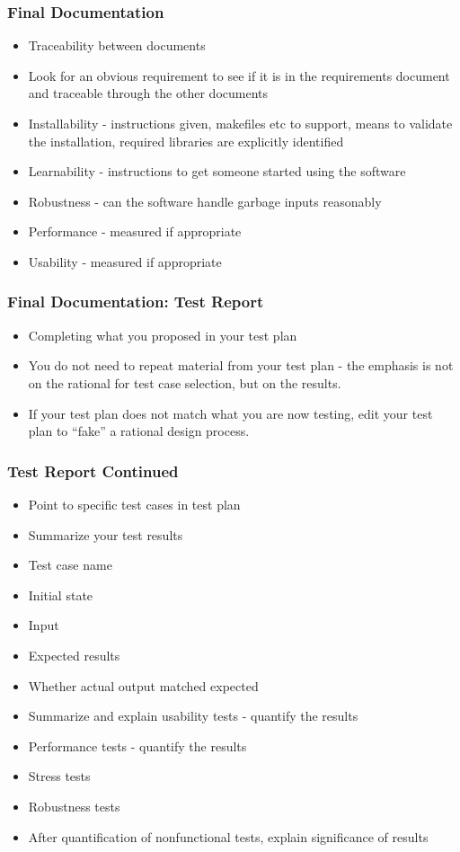 \documentclass[t,12pt,numbers,fleqn]{beamer}
\begin{document}
\begin{frame}
\frametitle{Final Documentation}
\begin{itemize}
\item Traceability between documents
\item Look for an obvious requirement to see if it is in the requirements
  document and traceable through the other documents
\item Installability - instructions given, makefiles etc to support, means to
  validate the installation, required libraries are explicitly identified
\item Learnability - instructions to get someone started using the software
\item Robustness - can the software handle garbage inputs reasonably
\item Performance - measured if appropriate
\item Usability - measured if appropriate
\end{itemize}
\end{frame}


\begin{frame}
\frametitle{Final Documentation: Test Report}
\begin{itemize}
\item Completing what you proposed in your test plan
\item You do not need to repeat material from your test plan - the emphasis is
  not on the rational for test case selection, but on the results.
\item If your test plan does not match what you are now testing, edit your test
  plan to ``fake'' a rational design process.
\end{itemize}
\end{frame}


\begin{frame}
\frametitle{Test Report Continued}
\begin{itemize}
\item Point to specific test cases in test plan
\item Summarize your test results
\bi
\item Test case name
\item Initial state
\item Input
\item Expected results
\item Whether actual output matched expected
\ei
\item Summarize and explain usability tests - quantify the results
\item Performance tests - quantify the results
\item Stress tests
\item Robustness tests
\item After quantification of nonfunctional tests, explain significance of
  results
\end{itemize}
\end{frame}
\end{document}
